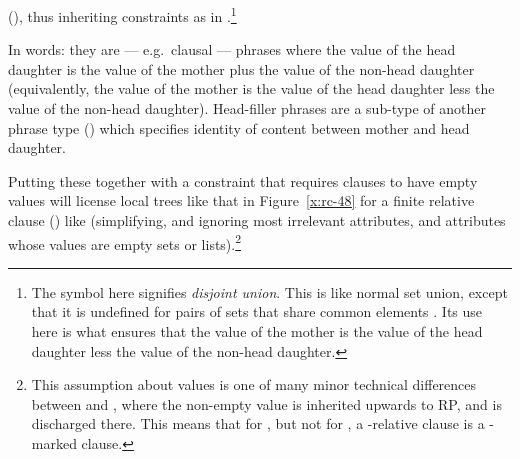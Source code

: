 \documentclass[output=paper,biblatex,babelshorthands,newtxmath,draftmode,colorlinks,citecolor=brown]{langscibook}
\begin{document}
(), thus inheriting constraints as in .\footnote{\label{fn-disjoint-set-union}The
  \isi{$\uplus$} symbol here signifies \emph{disjoint union}. This is like normal set union,
  except that it is undefined for pairs of sets that share common elements \citep[445]{Sag97a}. Its use here
  is what ensures that the  value of the mother is the  value of the
  head daughter less the  value of the non-head daughter.}
\begin{exe}\ex\label{x:rc-47}\label{ex-head-filler-phrase}
\end{exe}
In words: they are  ---
e.g.\ clausal --- phrases where the  value of the head daughter is the
 value of the mother plus the  value of the non-head daughter
(equivalently, the  value of the mother is the  value of the
head daughter less the  value of the non-head daughter). Head-filler phrases are a
sub-type of another phrase type () which specifies identity of
content between mother and head daughter.

Putting these together with a constraint that requires clauses to have empty 
values will license local trees like that in Figure~\ref{x:rc-48} for a finite relative
clause () like  (simplifying, and
ignoring most irrelevant attributes, and attributes whose values are empty sets or lists).\footnote{\label{fn:rc-3}This
  assumption about  values is one of many minor technical differences between
   and , where the non-empty  value is
  inherited upwards to RP, and is discharged there. This means
  that for \citeauthor{Pollard:Sag:94}, but not for \citet{Sag:97}, a -relative
  clause is a -marked clause.}
\end{document}
